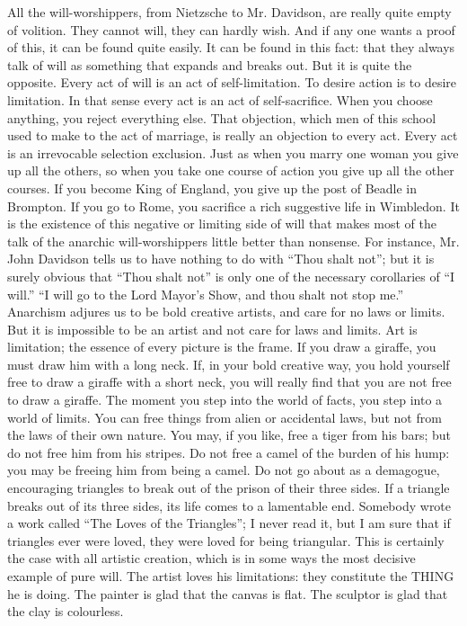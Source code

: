All the will-worshippers, from Nietzsche to Mr. Davidson, are really quite empty of volition. They cannot will, they can hardly wish. And if any one wants a proof of this, it can be found quite easily. It can be found in this fact: that they always talk of will as something that expands and breaks out. But it is quite the opposite. Every act of will is an act of self-limitation. To desire action is to desire limitation. In that sense every act is an act of self-sacrifice. When you choose anything, you reject everything else. That objection, which men of this school used to make to the act of marriage, is really an objection to every act. Every act is an irrevocable selection exclusion. Just as when you marry one woman you give up all the others, so when you take one course of action you give up all the other courses. If you become King of England, you give up the post of Beadle in Brompton. If you go to Rome, you sacrifice a rich suggestive life in Wimbledon. It is the existence of this negative or limiting side of will that makes most of the talk of the anarchic will-worshippers little better than nonsense. For instance, Mr. John Davidson tells us to have nothing to do with “Thou shalt not”; but it is surely obvious that “Thou shalt not” is only one of the necessary corollaries of “I will.” “I will go to the Lord Mayor’s Show, and thou shalt not stop me.” Anarchism adjures us to be bold creative artists, and care for no laws or limits. But it is impossible to be an artist and not care for laws and limits. Art is limitation; the essence of every picture is the frame. If you draw a giraffe, you must draw him with a long neck. If, in your bold creative way, you hold yourself free to draw a giraffe with a short neck, you will really find that you are not free to draw a giraffe. The moment you step into the world of facts, you step into a world of limits. You can free things from alien or accidental laws, but not from the laws of their own nature. You may, if you like, free a tiger from his bars; but do not free him from his stripes. Do not free a camel of the burden of his hump: you may be freeing him from being a camel. Do not go about as a demagogue, encouraging triangles to break out of the prison of their three sides. If a triangle breaks out of its three sides, its life comes to a lamentable end. Somebody wrote a work called “The Loves of the Triangles”; I never read it, but I am sure that if triangles ever were loved, they were loved for being triangular. This is certainly the case with all artistic creation, which is in some ways the most decisive example of pure will. The artist loves his limitations: they constitute the THING he is doing. The painter is glad that the canvas is flat. The sculptor is glad that the clay is colourless.

